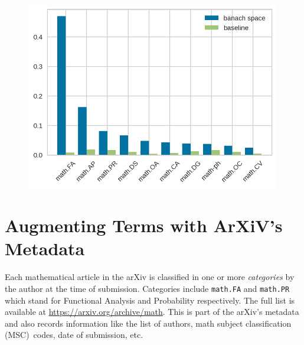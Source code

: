 \documentclass[submission,copyright,creativecommons]{eptcs}
\begin{document}
\begin{figure}[h!]
\begin{minipage}{0.4\textwidth}
\end{minipage}\hfill
\begin{minipage}{0.55\textwidth}
    \centering
    \includegraphics[width=0.99\textwidth]{images/barcomp.png}
\end{minipage}
\end{figure}


\section{Augmenting Terms with ArXiV's Metadata}
Each mathematical article in the arXiv is classified in one or more
\emph{categories}  by the author at
the time of submission. Categories include \texttt{math.FA} and  \texttt{math.PR} which stand for Functional Analysis and Probability respectively. The full list is available at \url{https://arxiv.org/archive/math}.
This is part of  the arXiv's metadata and also records information like the list of authors, math subject classification (MSC)~codes, date of submission, etc. 
\end{document}
